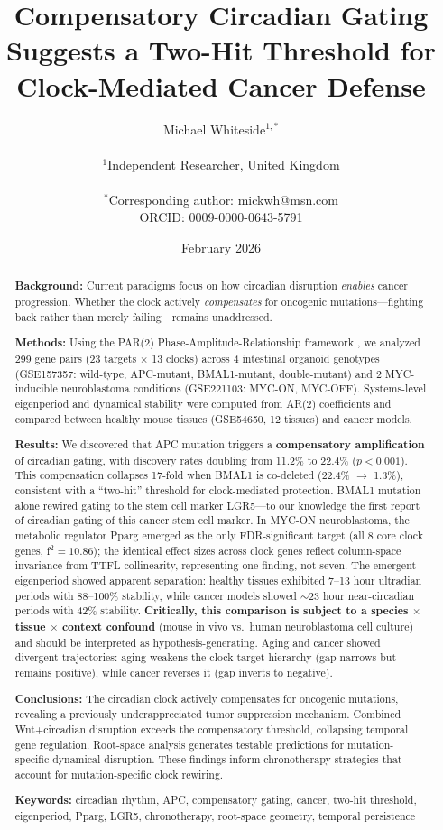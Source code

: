 \documentclass[11pt,letterpaper]{article}
\title{\textbf{Compensatory Circadian Gating Suggests a Two-Hit Threshold for Clock-Mediated Cancer Defense}}
\author{
Michael Whiteside$^{1,*}$ \\
\\
$^1$Independent Researcher, United Kingdom \\
\\
$^*$Corresponding author: mickwh@msn.com \\
ORCID: 0009-0000-0643-5791
}
\date{February 2026}
\begin{document}
\maketitle

\begin{abstract}
\noindent\textbf{Background:} Current paradigms focus on how circadian disruption \textit{enables} cancer progression. Whether the clock actively \textit{compensates} for oncogenic mutations---fighting back rather than merely failing---remains unaddressed.

\noindent\textbf{Methods:} Using the PAR(2) Phase-Amplitude-Relationship framework \citep{whiteside2026paper1}, we analyzed 299 gene pairs (23 targets $\times$ 13 clocks) across 4 intestinal organoid genotypes (GSE157357: wild-type, APC-mutant, BMAL1-mutant, double-mutant) and 2 MYC-inducible neuroblastoma conditions (GSE221103: MYC-ON, MYC-OFF). Systems-level eigenperiod and dynamical stability were computed from AR(2) coefficients and compared between healthy mouse tissues (GSE54650, 12 tissues) and cancer models.

\noindent\textbf{Results:} We discovered that APC mutation triggers a \textbf{compensatory amplification} of circadian gating, with discovery rates doubling from 11.2\% to 22.4\% ($p < 0.001$). This compensation collapses 17-fold when BMAL1 is co-deleted (22.4\% $\rightarrow$ 1.3\%), consistent with a ``two-hit'' threshold for clock-mediated protection. BMAL1 mutation alone rewired gating to the stem cell marker LGR5---to our knowledge the first report of circadian gating of this cancer stem cell marker. In MYC-ON neuroblastoma, the metabolic regulator Pparg emerged as the only FDR-significant target (all 8 core clock genes, f$^2 = 10.86$); the identical effect sizes across clock genes reflect column-space invariance from TTFL collinearity, representing one finding, not seven. The emergent eigenperiod showed apparent separation: healthy tissues exhibited 7--13 hour ultradian periods with 88--100\% stability, while cancer models showed $\sim$23 hour near-circadian periods with 42\% stability. \textbf{Critically, this comparison is subject to a species $\times$ tissue $\times$ context confound} (mouse in vivo vs.\ human neuroblastoma cell culture) and should be interpreted as hypothesis-generating. Aging and cancer showed divergent trajectories: aging weakens the clock-target hierarchy (gap narrows but remains positive), while cancer reverses it (gap inverts to negative).

\noindent\textbf{Conclusions:} The circadian clock actively compensates for oncogenic mutations, revealing a previously underappreciated tumor suppression mechanism. Combined Wnt+circadian disruption exceeds the compensatory threshold, collapsing temporal gene regulation. Root-space analysis generates testable predictions for mutation-specific dynamical disruption. These findings inform chronotherapy strategies that account for mutation-specific clock rewiring.

\noindent\textbf{Keywords:} circadian rhythm, APC, compensatory gating, cancer, two-hit threshold, eigenperiod, Pparg, LGR5, chronotherapy, root-space geometry, temporal persistence
\end{abstract}
\end{document}

